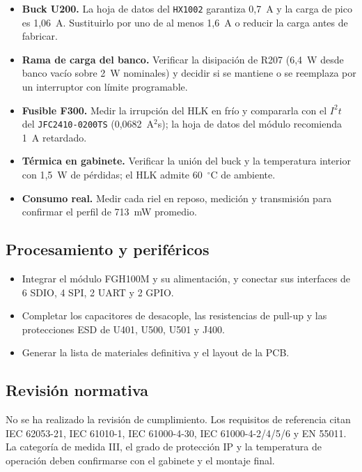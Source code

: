 \documentclass[11pt,a4paper]{article}
\begin{document}
\begin{itemize}
  \item \textbf{Buck U200.} La hoja de datos del \texttt{HX1002} garantiza
        0,7~A y la carga de pico es 1,06~A. Sustituirlo por uno de al menos
        1,6~A o reducir la carga antes de fabricar.
  \item \textbf{Rama de carga del banco.} Verificar la disipación de R207
        (6,4~W desde banco vacío sobre 2~W nominales) y decidir si se mantiene
        o se reemplaza por un interruptor con límite programable.
  \item \textbf{Fusible F300.} Medir la irrupción del HLK en frío y compararla
        con el $I^2t$ del \texttt{JFC2410-0200TS} (0,0682~A$^2$s); la hoja de
        datos del módulo recomienda 1~A retardado.
  \item \textbf{Térmica en gabinete.} Verificar la unión del buck y la
        temperatura interior con 1,5~W de pérdidas; el HLK admite 60~$^\circ$C
        de ambiente.
  \item \textbf{Consumo real.} Medir cada riel en reposo, medición y
        transmisión para confirmar el perfil de 713~mW promedio.
\end{itemize}

\subsection{Procesamiento y periféricos}

\begin{itemize}
  \item Integrar el módulo FGH100M y su alimentación, y conectar sus interfaces
        de 6 SDIO, 4 SPI, 2 UART y 2 GPIO.
  \item Completar los capacitores de desacople, las resistencias de pull-up y
        las protecciones ESD de U401, U500, U501 y J400.
  \item Generar la lista de materiales definitiva y el layout de la PCB.
\end{itemize}

\subsection{Revisión normativa}

No se ha realizado la revisión de cumplimiento. Los requisitos de referencia
citan IEC 62053-21, IEC 61010-1, IEC 61000-4-30, IEC 61000-4-2/4/5/6 y
EN 55011. La categoría de medida III, el grado de protección IP y la
temperatura de operación deben confirmarse con el gabinete y el montaje final.
\end{document}
